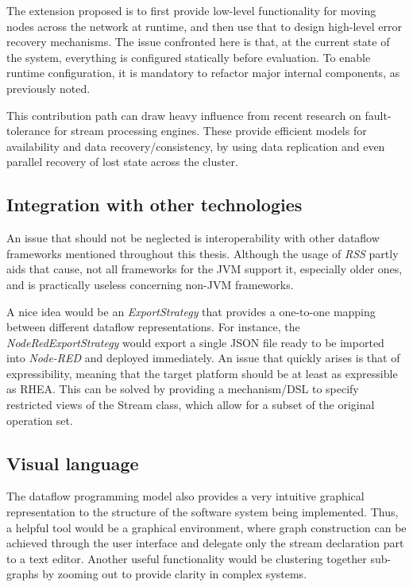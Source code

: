 \documentclass[sigplan,review,anonymous]{acmart}
\begin{document}
The extension proposed is to first provide low-level functionality for moving
nodes across the network at runtime, and then use that to design high-level
error recovery mechanisms. The issue confronted here is that, at the current
state of the system, everything is configured statically before evaluation. To
enable runtime configuration, it is mandatory to refactor major internal
components, as previously noted.

This contribution path can draw heavy influence from recent research on
fault-tolerance for stream processing engines\cite{borealis,dstreams,wide_area}.
These provide efficient models for availability and data recovery/consistency,
by using data replication and even parallel recovery of lost state across the
cluster.

\subsection{Integration with other technologies}

An issue that should not be neglected is interoperability with other dataflow
frameworks mentioned throughout this thesis. Although the usage of \textit{RSS}
partly aids that cause, not all frameworks for the JVM support it, especially
older ones, and is practically useless concerning non-JVM frameworks.

A nice idea would be an \textit{ExportStrategy} that provides a one-to-one
mapping between different dataflow representations. For instance, the
\textit{NodeRedExportStrategy} would export a single JSON file ready to be
imported into \textit{Node-RED} and deployed immediately. An issue that quickly
arises is that of expressibility, meaning that the target platform should be at
least as expressible as \textsc{RHEA}. This can be solved by providing a
mechanism/DSL to specify restricted views of the Stream class, which allow for a
subset of the original operation set.

\subsection{Visual language}

The dataflow programming model also provides a very intuitive graphical
representation to the structure of the software system being implemented. Thus,
a helpful tool would be a graphical environment, where graph construction can be
achieved through the user interface and delegate only the stream declaration
part to a text editor. Another useful functionality would be clustering together
sub-graphs by zooming out to provide clarity in complex systems.
\end{document}
